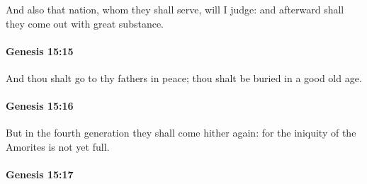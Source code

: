 			And also that nation, whom they shall serve, will I judge: and afterward shall they come out with great substance.


		\paragraph{Genesis 15:15} %
			\label{GENESIS-15-15}

			And thou shalt go to thy fathers in peace; thou shalt be buried in a good old age.


		\paragraph{Genesis 15:16} %
			\label{GENESIS-15-16}

			But in the fourth generation they shall come hither again: for the iniquity of the Amorites is not yet full.


		\paragraph{Genesis 15:17} %
			\label{GENESIS-15-17}

